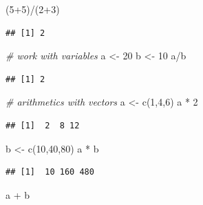 \documentclass[
  12pt,
]{style/krantz}
\newenvironment{Shaded}{\begin{snugshade}}{\end{snugshade}}
\newcommand{\CommentTok}[1]{\textcolor[rgb]{0.56,0.35,0.01}{\textit{#1}}}
\newcommand{\DecValTok}[1]{\textcolor[rgb]{0.00,0.00,0.81}{#1}}
\newcommand{\FunctionTok}[1]{\textcolor[rgb]{0.00,0.00,0.00}{#1}}
\newcommand{\NormalTok}[1]{#1}
\newcommand{\OtherTok}[1]{\textcolor[rgb]{0.56,0.35,0.01}{#1}}
\newcommand{\SpecialCharTok}[1]{\textcolor[rgb]{0.00,0.00,0.00}{#1}}
\begin{document}
\begin{Shaded}
\begin{Highlighting}[]
\NormalTok{(}\DecValTok{5}\SpecialCharTok{+}\DecValTok{5}\NormalTok{)}\SpecialCharTok{/}\NormalTok{(}\DecValTok{2}\SpecialCharTok{+}\DecValTok{3}\NormalTok{)}
\end{Highlighting}
\end{Shaded}

\begin{verbatim}
## [1] 2
\end{verbatim}

\begin{Shaded}
\begin{Highlighting}[]
\CommentTok{\# work with variables}
\NormalTok{a }\OtherTok{\textless{}{-}} \DecValTok{20}
\NormalTok{b }\OtherTok{\textless{}{-}} \DecValTok{10}
\NormalTok{a}\SpecialCharTok{/}\NormalTok{b}
\end{Highlighting}
\end{Shaded}

\begin{verbatim}
## [1] 2
\end{verbatim}

\begin{Shaded}
\begin{Highlighting}[]
\CommentTok{\# arithmetics with vectors}
\NormalTok{a }\OtherTok{\textless{}{-}} \FunctionTok{c}\NormalTok{(}\DecValTok{1}\NormalTok{,}\DecValTok{4}\NormalTok{,}\DecValTok{6}\NormalTok{)}
\NormalTok{a }\SpecialCharTok{*} \DecValTok{2}
\end{Highlighting}
\end{Shaded}

\begin{verbatim}
## [1]  2  8 12
\end{verbatim}

\begin{Shaded}
\begin{Highlighting}[]
\NormalTok{b }\OtherTok{\textless{}{-}} \FunctionTok{c}\NormalTok{(}\DecValTok{10}\NormalTok{,}\DecValTok{40}\NormalTok{,}\DecValTok{80}\NormalTok{)}
\NormalTok{a }\SpecialCharTok{*}\NormalTok{ b}
\end{Highlighting}
\end{Shaded}

\begin{verbatim}
## [1]  10 160 480
\end{verbatim}

\begin{Shaded}
\begin{Highlighting}[]
\NormalTok{a }\SpecialCharTok{+}\NormalTok{ b}
\end{Highlighting}
\end{Shaded}
\end{document}
